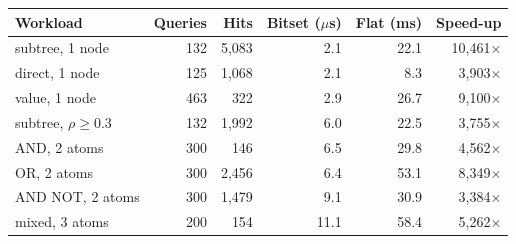 \begin{tabular}{@{}lrrrrr@{}}
\toprule
Workload & Queries & Hits & Bitset ($\mu$s) & Flat (ms) & Speed-up \\
\midrule
subtree, 1 node & 132 & 5,083 & 2.1 & 22.1 & 10,461$\times$ \\
direct, 1 node & 125 & 1,068 & 2.1 & 8.3 & 3,903$\times$ \\
value, 1 node & 463 & 322 & 2.9 & 26.7 & 9,100$\times$ \\
subtree, $\rho \ge 0.3$ & 132 & 1,992 & 6.0 & 22.5 & 3,755$\times$ \\
AND, 2 atoms & 300 & 146 & 6.5 & 29.8 & 4,562$\times$ \\
OR, 2 atoms & 300 & 2,456 & 6.4 & 53.1 & 8,349$\times$ \\
AND NOT, 2 atoms & 300 & 1,479 & 9.1 & 30.9 & 3,384$\times$ \\
mixed, 3 atoms & 200 & 154 & 11.1 & 58.4 & 5,262$\times$ \\
\bottomrule
\end{tabular}
